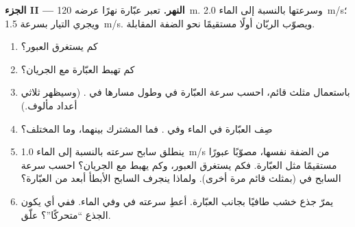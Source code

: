 \begin{problem}
\medskip
\noindent\textbf{الجزء II --- النهر.}
تعبر عبّارة نهرًا عرضه \qty{120}{m}. وسرعتها بالنسبة إلى
الماء \qty{2.0}{m/s}؛ ويجري التيار بسرعة \qty{1.5}{m/s}. ويصوّب الربّان
أولًا مستقيمًا نحو الضفة المقابلة.
\begin{enumerate}[resume]
  \item كم يستغرق العبور؟
  \item كم تهبط العبّارة مع الجريان؟
  \item باستعمال مثلث قائم، احسب سرعة العبّارة في  وطول مسارها في . (وسيظهر
        ثلاثي أعداد مألوف.)
  \item صِف  العبّارة في  الماء وفي
        . فما المشترك بينهما، وما المختلف؟
  \item ينطلق سابح سرعته بالنسبة إلى الماء \qty{1.0}{m/s}
        من الضفة نفسها، مصوّبًا عبورًا مستقيمًا مثل
        العبّارة. فكم يستغرق العبور، وكم يهبط مع الجريان؟
        احسب سرعة السابح في  (بمثلث قائم مرة
        أخرى). ولماذا ينجرف السابح الأبطأ أبعد من العبّارة؟
  \item يمرّ جذع خشب طافيًا بجانب العبّارة. أعطِ سرعته في 
        وفي  الماء. ففي أي  يكون الجذع ``متحركًا''؟
        علّق.
\end{enumerate}


\end{problem}

